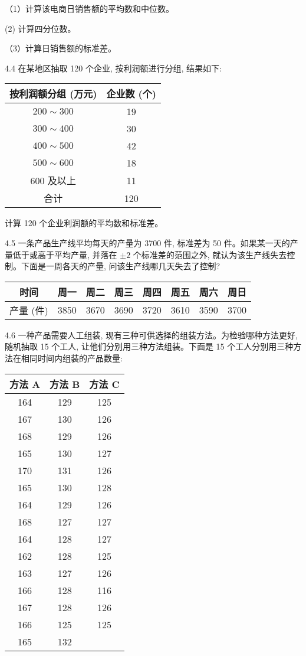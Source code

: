 \documentclass[10pt]{article}
\begin{document}
\begin{CJK*}{UTF8}{bsmi}
（1）计算该电商日销售额的平均数和中位数。

(2) 计算四分位数。

（3）计算日销售额的标准差。

4.4 在某地区抽取 120 个企业, 按利润额进行分组, 结果如下:

\begin{center}
\begin{tabular}{cc}
\hline
按利润额分组 (万元) & 企业数 (个) \\
\hline
$200 \sim 300$ & 19 \\
$300 \sim 400$ & 30 \\
$400 \sim 500$ & 42 \\
$500 \sim 600$ & 18 \\
600 及以上 & 11 \\
\hline
合计 & 120 \\
\hline
\end{tabular}
\end{center}

计算 120 个企业利润额的平均数和标准差。

4.5 一条产品生产线平均每天的产量为 3700 件, 标准差为 50 件。如果某一天的产量低于或高于平均产量, 并落在 $\pm 2$ 个标准差的范围之外, 就认为该生产线失去控制。下面是一周各天的产量, 问该生产线哪几天失去了控制?

\begin{center}
\begin{tabular}{cccccccc}
\hline
时间 & 周一 & 周二 & 周三 & 周四 & 周五 & 周六 & 周日 \\
\hline
产量 (件) & 3850 & 3670 & 3690 & 3720 & 3610 & 3590 & 3700 \\
\hline
\end{tabular}
\end{center}

4.6 一种产品需要人工组装, 现有三种可供选择的组装方法。为检验哪种方法更好, 随机抽取 15 个工人, 让他们分别用三种方法组装。下面是 15 个工人分别用三种方法在相同时间内组装的产品数量:

\begin{center}
\begin{tabular}{ccc}
\hline
方法 A & 方法 B & 方法 C \\
\hline
164 & 129 & 125 \\
167 & 130 & 126 \\
168 & 129 & 126 \\
165 & 130 & 127 \\
170 & 131 & 126 \\
165 & 130 & 128 \\
164 & 129 & 126 \\
168 & 127 & 127 \\
164 & 128 & 127 \\
162 & 128 & 125 \\
163 & 127 & 126 \\
166 & 128 & 116 \\
167 & 128 & 126 \\
166 & 125 & 125 \\
\hline
165 & 132 &  \\
\hline
\end{tabular}
\end{center}


\end{CJK*}
\end{document}
